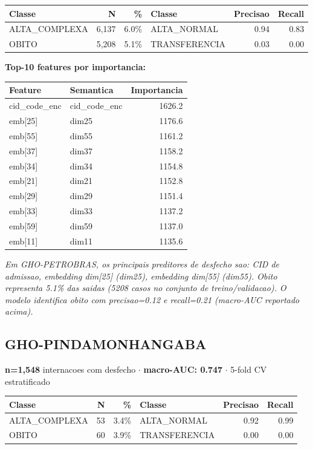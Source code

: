 \documentclass[11pt,a4paper]{article}
\begin{document}
\begin{tabular}{lrr|lrr}
\toprule
Classe & N & \% & Classe & Precisao & Recall \\
\midrule
ALTA\_COMPLEXA & 6,137 & 6.0\% & ALTA\_NORMAL & 0.94 & 0.83 \\
OBITO & 5,208 & 5.1\% & TRANSFERENCIA & 0.03 & 0.00 \\
\bottomrule
\end{tabular}

\vspace{4pt}\noindent\textbf{Top-10 features por importancia:}

\begin{tabular}{llr}
\toprule
Feature & Semantica & Importancia \\
\midrule
cid\_code\_enc & cid\_code\_enc & 1626.2 \\
emb[25] & dim25 & 1176.6 \\
emb[55] & dim55 & 1161.2 \\
emb[37] & dim37 & 1158.2 \\
emb[34] & dim34 & 1154.8 \\
emb[21] & dim21 & 1152.8 \\
emb[29] & dim29 & 1151.4 \\
emb[33] & dim33 & 1137.2 \\
emb[59] & dim59 & 1137.0 \\
emb[11] & dim11 & 1135.6 \\
\bottomrule
\end{tabular}

\vspace{4pt}\noindent\textit{Em GHO-PETROBRAS, os principais preditores de desfecho sao: CID de admissao, embedding dim[25] (dim25), embedding dim[55] (dim55). Obito representa 5.1\% das saidas (5208 casos no conjunto de treino/validacao). O modelo identifica obito com precisao=0.12 e recall=0.21 (macro-AUC reportado acima).}

\subsection{GHO-PINDAMONHANGABA}
\textbf{n=1,548} internacoes com desfecho $\cdot$ \textbf{macro-AUC: 0.747} $\cdot$ 5-fold CV estratificado

\begin{tabular}{lrr|lrr}
\toprule
Classe & N & \% & Classe & Precisao & Recall \\
\midrule
ALTA\_COMPLEXA & 53 & 3.4\% & ALTA\_NORMAL & 0.92 & 0.99 \\
OBITO & 60 & 3.9\% & TRANSFERENCIA & 0.00 & 0.00 \\
\bottomrule
\end{tabular}
\end{document}
